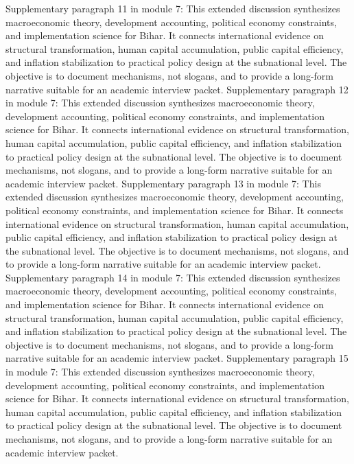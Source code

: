 \documentclass[preprint,12pt]{elsarticle}
\begin{document}
Supplementary paragraph 11 in module 7: This extended discussion synthesizes macroeconomic theory, development accounting, political economy constraints, and implementation science for Bihar. It connects international evidence on structural transformation, human capital accumulation, public capital efficiency, and inflation stabilization to practical policy design at the subnational level. The objective is to document mechanisms, not slogans, and to provide a long-form narrative suitable for an academic interview packet.
Supplementary paragraph 12 in module 7: This extended discussion synthesizes macroeconomic theory, development accounting, political economy constraints, and implementation science for Bihar. It connects international evidence on structural transformation, human capital accumulation, public capital efficiency, and inflation stabilization to practical policy design at the subnational level. The objective is to document mechanisms, not slogans, and to provide a long-form narrative suitable for an academic interview packet.
Supplementary paragraph 13 in module 7: This extended discussion synthesizes macroeconomic theory, development accounting, political economy constraints, and implementation science for Bihar. It connects international evidence on structural transformation, human capital accumulation, public capital efficiency, and inflation stabilization to practical policy design at the subnational level. The objective is to document mechanisms, not slogans, and to provide a long-form narrative suitable for an academic interview packet.
Supplementary paragraph 14 in module 7: This extended discussion synthesizes macroeconomic theory, development accounting, political economy constraints, and implementation science for Bihar. It connects international evidence on structural transformation, human capital accumulation, public capital efficiency, and inflation stabilization to practical policy design at the subnational level. The objective is to document mechanisms, not slogans, and to provide a long-form narrative suitable for an academic interview packet.
Supplementary paragraph 15 in module 7: This extended discussion synthesizes macroeconomic theory, development accounting, political economy constraints, and implementation science for Bihar. It connects international evidence on structural transformation, human capital accumulation, public capital efficiency, and inflation stabilization to practical policy design at the subnational level. The objective is to document mechanisms, not slogans, and to provide a long-form narrative suitable for an academic interview packet.
\end{document}
